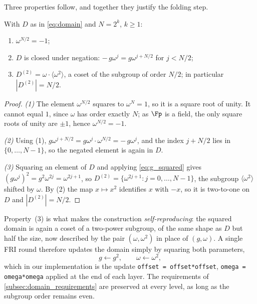 Three properties follow, and together they justify the folding step.
 
\begin{proposition}
\label{prop:domain}
With $D$ as in \cref{eq:domain} and $N = 2^k$, $k \geq 1$:
\begin{enumerate}
  \item $\omega^{N/2} = -1$;
  \item $D$ is closed under negation: $-\,g\omega^{j} = g\omega^{j+N/2}$
    for $j < N/2$;
  \item $D^{(2)} = \omega \cdot \langle\omega^2\rangle$, a coset of the
    subgroup of order $N/2$; in particular $|D^{(2)}| = N/2$.
\end{enumerate}
\end{proposition}

\begin{proof}
\emph{(1)} The element $\omega^{N/2}$ squares to
$\omega^N = 1$, so it is a square root of unity. It cannot equal $1$,
since $\omega$ has order exactly $N$; as $\Fp$ is a field, the only
square roots of unity are $\pm 1$, hence $\omega^{N/2} = -1$.

\emph{(2)} Using (1),
$g\omega^{j+N/2} = g\omega^{j}\cdot\omega^{N/2} = -\,g\omega^{j}$, and
the index $j+N/2$ lies in $\{0,\dots,N-1\}$, so the negated element is
again in $D$.

\emph{(3)} Squaring an element of $D$ and applying \cref{eq:g_squared}
gives $(g\omega^{j})^2 = g^2\omega^{2j} = \omega^{2j+1}$, so
$D^{(2)} = \{\omega^{2j+1} : j = 0,\dots,N-1\}$, the subgroup
$\langle\omega^2\rangle$ shifted by $\omega$. By (2) the map
$x \mapsto x^2$ identifies $x$ with $-x$, so it is two-to-one on $D$
and $|D^{(2)}| = N/2$.
\end{proof}

Property~(3) is what makes the construction \emph{self-reproducing}:
the squared domain is again a coset of a two-power subgroup, of the
same shape as $D$ but half the size, now described by the pair
$(\omega, \omega^2)$ in place of $(g, \omega)$. A single FRI round
therefore updates the domain simply by squaring both parameters,
%
\begin{equation}
\label{eq:domain_update}
g \leftarrow g^2, \qquad \omega \leftarrow \omega^2,
\end{equation}
%
which in our implementation is the update
\texttt{offset = offset*offset}, \texttt{omega = omega*omega} applied
at the end of each layer. The requirements of
\cref{subsec:domain_requirements} are preserved at every level, as long
as the subgroup order remains even.

